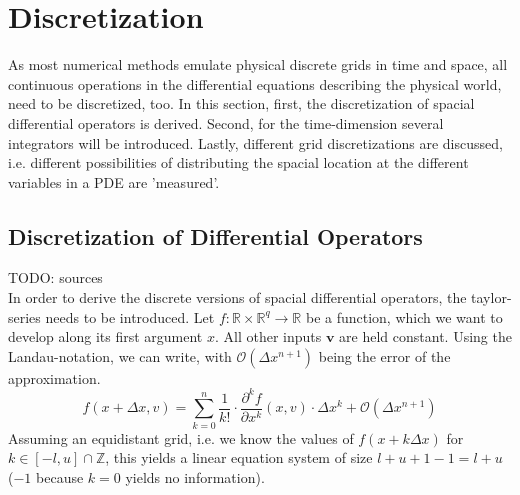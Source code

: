 \chapter{Discretization}\label{chapter:introduction}
As most numerical methods emulate physical discrete grids in time and space, all continuous operations in the differential equations describing the physical world, need to be discretized, too.
In this section, first, the discretization of spacial differential operators is derived.
Second, for the time-dimension several integrators will be introduced.
Lastly, different grid discretizations are discussed, i.e. different possibilities of distributing the spacial location at the different variables in a PDE are 'measured'.

\section{Discretization of Differential Operators}
TODO: sources\\
In order to derive the discrete versions of spacial differential operators, the taylor-series needs to be introduced.
Let $f:\mathbb{R}\times\mathbb{R}^q\rightarrow \mathbb{R}$ be a function, which we want to develop along its first argument $x$.
All other inputs $\boldsymbol{v}$ are held constant.
Using the Landau-notation, we can write, with $\mathcal{O}(\Delta x ^{n+1})$ being the error of the approximation.
\begin{equation}
f(x+\Delta x,v) = \sum_{k=0}^{n}\frac{1}{k!}\cdot\frac{\partial^k f}{\partial x ^k}(x,v)\cdot \Delta x^k + \mathcal{O}(\Delta x ^{n+1})
\end{equation}
Assuming an equidistant grid, i.e. we know the values of $f(x+k\Delta x)$ for $k\in [-l,u] \cap \mathbb{Z}$, this yields a linear equation system of size $l + u + 1 - 1= l + u$ ($-1$ because $k=0$ yields no information).

